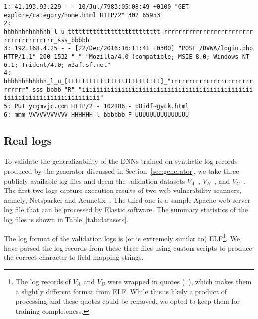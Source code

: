 \documentclass{article}
\begin{document}
\begin{figure*}[t]
    \centering
    \tiny
    \begin{framed}
    \texttt{1: 41.193.93.229 - - 10/Jul/7983:05:08:49 +0100 "GET explore/category/home.html HTTP/2" 302 65953} \\
    \texttt{2: hhhhhhhhhhhhh\_l\_u\_tttttttttttttttttttttttttt\_rrrrrrrrrrrrrrrrrrrrrrrrrrrrrrrrrrrrrrr\_sss\_bbbbb} \\
    \texttt{3: 192.168.4.25 - - [22/Dec/2016:16:11:41 +0300] "POST /DVWA/login.php HTTP/1.1" 200 1532 "-" "Mozilla/4.0 (compatible; MSIE 8.0; Windows NT 6.1; Trident/4.0; w3af.sf.net"} \\
    \texttt{4: hhhhhhhhhhhh\_l\_u\_[tttttttttttttttttttttttttt]\_"rrrrrrrrrrrrrrrrrrrrrrrrrrrrr"\_sss\_bbbb\_"R"\_"iiiiiiiiiiiiiiiiiiiiiiiiiiiiiiiiiiiiiiiiiiiiiiiiiiiiiiiiiiiiiiiiiiiiiiiiiii"} \\
    \texttt{5: PUT ycgmvjc.com HTTP/2 - 102186 - \url{d8idf~gyck.html}} \\
    \texttt{6: mmm\_VVVVVVVVVVV\_HHHHHH\_l\_bbbbbb\_F\_UUUUUUUUUUUUUUU}
    \end{framed}
    \caption{An example of a record for translation generated by our log generator.  Lines 1, 3, and 5 are examples of logs in CLF, ELF, and random format, respectively. The characters in lines 2, 4, and 6 represent mapping to their equivalent field type (described in Table~\ref{tab:fields}).  }
    \label{fig:synth_record}
\end{figure*}


\subsection{Real logs} \label{sec:real_data}

To validate the generalizability of the DNNs trained on synthetic log records produced by the generator discussed in Section~\ref{sec:generator}, we take three publicly available log files and deem the validation datasets $V_A$~\cite{apacheht89:online}, $V_B$~\cite{apacheht41:online}, and $V_C$~\cite{examples55:online}. The first two logs capture execution results of two web vulnerability scanners, namely, Netsparker and Acunetix~\cite{BASSEYYAR201828}. The third one is a sample Apache web server log file that can be processed by Elastic software. The summary statistics of the log files is shown in Table~\ref{tab:datasets}.

The log format of the validation logs is (or is extremely similar to) ELF\footnote{The log records of $V_A$ and $V_B$ were wrapped in quotes (\texttt{"}), which makes them a slightly different format from ELF. While this is likely a product of processing and these quotes could be removed, we opted to keep them for training completeness.}. We have parsed the log records from these three files using custom scripts to produce the correct character-to-field mapping strings. 
\end{document}
